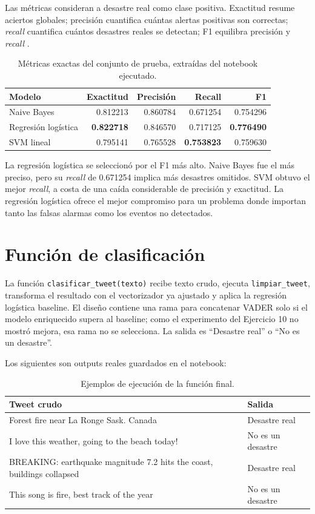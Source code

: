 \documentclass[11pt,letterpaper]{article}
\newcommand{\code}[1]{\texttt{#1}}
\begin{document}
Las métricas consideran a desastre real como clase positiva. Exactitud resume aciertos globales; precisión cuantifica cuántas alertas positivas son correctas; \emph{recall} cuantifica cuántos desastres reales se detectan; F1 equilibra precisión y \emph{recall} \cite{sklearn,pedregosa2011}.

\begin{table}[H]
\centering
\caption{Métricas exactas del conjunto de prueba, extraídas del notebook ejecutado.}
\label{tab:modelos}
\begin{tabular}{@{}lrrrr@{}}
\toprule
Modelo & Exactitud & Precisión & Recall & F1 \\
\midrule
Naive Bayes & 0.812213 & 0.860784 & 0.671254 & 0.754296 \\
Regresión logística & \textbf{0.822718} & 0.846570 & 0.717125 & \textbf{0.776490} \\
SVM lineal & 0.795141 & 0.765528 & \textbf{0.753823} & 0.759630 \\
\bottomrule
\end{tabular}
\end{table}

La regresión logística se seleccionó por el F1 más alto. Naive Bayes fue el más preciso, pero su \emph{recall} de 0.671254 implica más desastres omitidos. SVM obtuvo el mejor \emph{recall}, a costa de una caída considerable de precisión y exactitud. La regresión logística ofrece el mejor compromiso para un problema donde importan tanto las falsas alarmas como los eventos no detectados.

\section{Función de clasificación}

La función \code{clasificar\_tweet(texto)} recibe texto crudo, ejecuta \code{limpiar\_tweet}, transforma el resultado con el vectorizador ya ajustado y aplica la regresión logística baseline. El diseño contiene una rama para concatenar VADER solo si el modelo enriquecido supera al baseline; como el experimento del Ejercicio 10 no mostró mejora, esa rama no se selecciona. La salida es ``Desastre real'' o ``No es un desastre''.

Los siguientes son outputs reales guardados en el notebook:
\begin{table}[H]
\centering
\caption{Ejemplos de ejecución de la función final.}
\label{tab:funcion}
\begin{tabularx}{\textwidth}{@{}Yl@{}}
\toprule
Tweet crudo & Salida \\
\midrule
Forest fire near La Ronge Sask. Canada & Desastre real \\
I love this weather, going to the beach today! & No es un desastre \\
BREAKING: earthquake magnitude 7.2 hits the coast, buildings collapsed & Desastre real \\
This song is fire, best track of the year & No es un desastre \\
\bottomrule
\end{tabularx}
\end{table}
\end{document}
